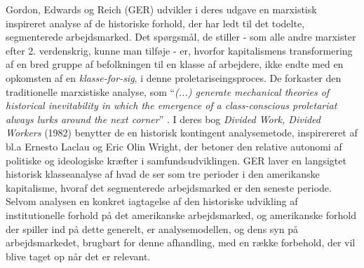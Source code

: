 Gordon, Edwards og Reich (GER) udvikler i deres udgave en marxistisk inspireret analyse af de historiske forhold, der har ledt til det todelte, segmenterede arbejdsmarked. Det spørgsmål, de stiller - som alle andre marxister efter 2. verdenskrig, kunne man tilføje - er, hvorfor kapitalismens transformering af en bred gruppe af befolkningen til en klasse af arbejdere, ikke endte med en opkomsten af en \emph{klasse-for-sig}, i denne proletariseingsproces.  De forkaster den traditionelle marxistiske analyse, som “\emph{(...) generate mechanical theories of historical inevitability in which the emergence of a class-conscious proletariat always lurks around the next corner}” \parencite[21]{Gordon1982}. I deres bog \emph{Divided Work, Divided Workers} (1982) benytter de en historisk kontingent analysemetode, inspirereret af bl.a Ernesto Laclau og Eric Olin Wright, der betoner den relative autonomi af politiske og ideologiske kræfter i samfundsudviklingen. GER laver en langsigtet historisk klasseanalyse af hvad de ser som tre perioder i den amerikanske kapitalisme, hvoraf det segmenterede arbejdsmarked er den seneste periode. Selvom analysen en konkret iagtagelse af den historiske udvikling af institutionelle forhold på det amerikanske arbejdsmarked, og amerikanske forhold der spiller ind på dette generelt, er analysemodellen, og dens syn på arbejdsmarkedet, brugbart for denne afhandling, med en række forbehold, der vil blive taget op når det er relevant. 

